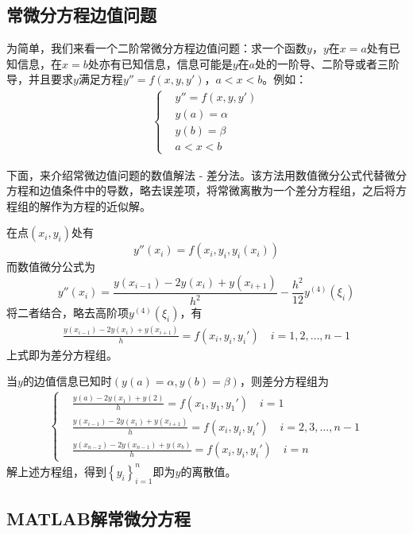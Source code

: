 	\subsection{常微分方程边值问题}
		\par
		为简单，我们来看一个二阶常微分方程边值问题：求一个函数$y$，$y$在$x=a$处有已知信息，在$x=b$处亦有已知信息，信息可能是$y$在$a$处的一阶导、二阶导或者三阶导，并且要求$y$满足方程$y''=f(x,y,y')$，$a<x<b$。例如：
		\begin{align*}
			\left\{
				\begin{aligned}
					&y''=f(x,y,y')\\
					&y(a)=\alpha\\
					&y(b)=\beta\\
					&a<x<b
				\end{aligned}
			\right.
		\end{align*}
		\par
		下面，来介绍常微边值问题的数值解法 - 差分法。该方法用数值微分公式代替微分方程和边值条件中的导数，略去误差项，将常微离散为一个差分方程组，之后将方程组的解作为方程的近似解。
		\par
		在点$(x_i,y_i)$处有
		\[
			y''(x_i)=f(x_i,y_i,y_i(x_i))
		\]
		而数值微分公式为
		\[
			y''(x_i)=\frac{y(x_{i-1})-2y(x_i)+y(x_{i+1})}{h^2}-\frac{h^2}{12}y^{(4)}(\xi_i)
		\]
		将二者结合，略去高阶项$y^{(4)}(\xi_i)$，有
		\begin{align*}
		\frac{y(x_{i-1}) - 2y(x_i) + y(x_{i+1})}{h} = f(x_i,y_i,y_i') \quad i =1,2,\dots,n-1
		\end{align*}
		上式即为差分方程组。
		\par
		当$y$的边值信息已知时$(y(a)=\alpha,y(b)=\beta)$，则差分方程组为
		\begin{align*}
		\left\{
			\begin{aligned}
			&\frac{y(a) - 2y(x_1) + y(2)}{h} = f(x_1,y_1,y_1') \quad i =1\\
			&\frac{y(x_{i-1}) - 2y(x_i) + y(x_{i+1})}{h} = f(x_i,y_i,y_i') \quad i =2,3,\dots,n-1 \\
			&\frac{y(x_{n-2}) - 2y(x_{n-1}) + y(x_{b})}{h} = f(x_i,y_i,y_i') \quad i =n
			\end{aligned}
		\right.
		\end{align*}
		解上述方程组，得到$\left\{y_i\right\}_{i=1}^n$即为$y$的离散值。

	\subsection{MATLAB解常微分方程}
